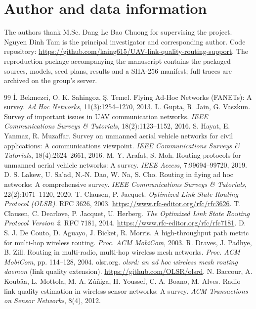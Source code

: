 \documentclass[11pt,a4paper]{article}
\begin{document}
\section*{Author and data information}
The authors thank M.Sc. Dang Le Bao Chuong for supervising the project.
Nguyen Dinh Tam is the principal investigator and corresponding author.
Code repository: \url{https://github.com/kaing615/UAV-link-quality-routing-support}.
The reproduction package accompanying the manuscript contains the packaged
sources, models, seed plans, results and a SHA-256 manifest; full traces are
archived on the group's server.
\begin{thebibliography}{99}
 İ. Bekmezci, O. K. Sahingoz, Ş. Temel.
Flying Ad-Hoc Networks (FANETs): A survey.
\textit{Ad Hoc Networks}, 11(3):1254--1270, 2013.
 L. Gupta, R. Jain, G. Vaszkun.
Survey of important issues in UAV communication networks.
\textit{IEEE Communications Surveys \& Tutorials}, 18(2):1123--1152, 2016.
 S. Hayat, E. Yanmaz, R. Muzaffar.
Survey on unmanned aerial vehicle networks for civil applications:
A communications viewpoint.
\textit{IEEE Communications Surveys \& Tutorials}, 18(4):2624--2661, 2016.
 M. Y. Arafat, S. Moh.
Routing protocols for unmanned aerial vehicle networks: A survey.
\textit{IEEE Access}, 7:99694--99720, 2019.
 D. S. Lakew, U. Sa'ad, N.-N. Dao, W. Na, S. Cho.
Routing in flying ad hoc networks: A comprehensive survey.
\textit{IEEE Communications Surveys \& Tutorials}, 22(2):1071--1120, 2020.
 T. Clausen, P. Jacquet.
\textit{Optimized Link State Routing Protocol (OLSR)}. RFC 3626, 2003.
\url{https://www.rfc-editor.org/rfc/rfc3626}.
 T. Clausen, C. Dearlove, P. Jacquet, U. Herberg.
\textit{The Optimized Link State Routing Protocol Version 2}. RFC 7181, 2014.
\url{https://www.rfc-editor.org/rfc/rfc7181}.
 D. S. J. De Couto, D. Aguayo, J. Bicket, R. Morris.
A high-throughput path metric for multi-hop wireless routing.
\textit{Proc. ACM MobiCom}, 2003.
 R. Draves, J. Padhye, B. Zill.
Routing in multi-radio, multi-hop wireless mesh networks.
\textit{Proc. ACM MobiCom}, pp. 114--128, 2004.
 olsr.org. \textit{olsrd: an ad hoc wireless mesh routing
daemon} (link quality extension). \url{https://github.com/OLSR/olsrd}.
 N. Baccour, A. Koubâa, L. Mottola, M. A. Zúñiga, H. Youssef,
C. A. Boano, M. Alves. Radio link quality estimation in wireless sensor
networks: A survey. \textit{ACM Transactions on Sensor Networks}, 8(4), 2012.

\end{thebibliography}
\end{document}
